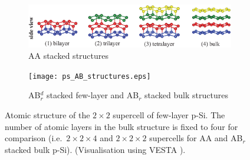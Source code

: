 \begin{figure}[htb]
  \centering
  \begin{subfigure}{\linewidth}
    \captionsetup{singlelinecheck=true}
    \includegraphics[width=\linewidth]{ps_AA_structures.eps}%
    \caption{AA stacked structures}
  \end{subfigure} 
  \begin{subfigure}{\linewidth}
    \captionsetup{singlelinecheck=true}
    \texttt{[image: ps\_AB\_structures.eps]}%
    \caption{AB$_r^d$ stacked few-layer and AB$_r$ stacked bulk structures}
  \end{subfigure}
\caption{Atomic structure of the $2\times2$ supercell of few-layer p-Si. The number of atomic layers in the bulk structure is fixed to four for comparison (i.e.\ $2\times2\times4$ and $2\times2\times2$ supercells for AA and AB$_r$ stacked bulk p-Si). (Visualisation using VESTA \cite{vesta}). \label{fig:ps_structures}}
\end{figure}

